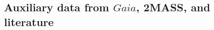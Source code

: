 \documentclass[
  journal=pasa,
  manuscript=research-paper, %
  year=2023,
  volume=37
]{cup-journal}
\begin{document}





\subsection{Auxiliary data from $Gaia$, 2MASS, and literature} \label{sec:non-spec_data}

\end{document}
